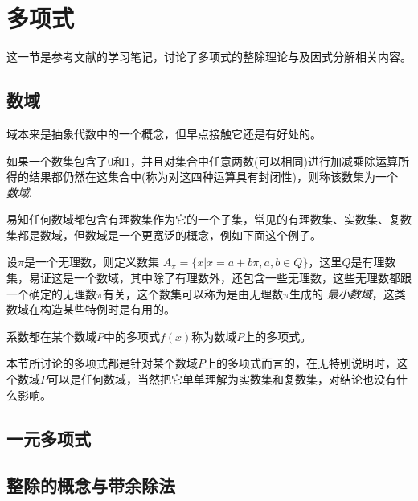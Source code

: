 
\section{多项式}
\label{sec:polynome}

这一节是参考文献\cite{advanced-algebra}的学习笔记，讨论了多项式的整除理论与及因式分解相关内容。

\subsection{数域}
\label{sec:number-field}

域本来是抽象代数中的一个概念，但早点接触它还是有好处的。

\begin{definition}
  如果一个数集包含了0和1，并且对集合中任意两数(可以相同)进行加减乘除运算所得的结果都仍然在这集合中(称为对这四种运算具有封闭性)，则称该数集为一个 \emph{数域}.
\end{definition}

易知任何数域都包含有理数集作为它的一个子集，常见的有理数集、实数集、复数集都是数域，但数域是一个更宽泛的概念，例如下面这个例子。

\begin{example}
  设$\pi$是一个无理数，则定义数集 $A_{\pi} = \{x|x=a+b\pi,a,b\in Q\}$，这里$Q$是有理数集，易证这是一个数域，其中除了有理数外，还包含一些无理数，这些无理数都跟一个确定的无理数$\pi$有关，这个数集可以称为是由无理数$\pi$生成的 \emph{最小数域}，这类数域在构造某些特例时是有用的。
\end{example}

\begin{definition}
  系数都在某个数域$P$中的多项式$f(x)$称为数域$P$上的多项式。
\end{definition}

本节所讨论的多项式都是针对某个数域$P$上的多项式而言的，在无特别说明时，这个数域$P$可以是任何数域，当然把它单单理解为实数集和复数集，对结论也没有什么影响。

\subsection{一元多项式}
\label{sec:polynome-with-one-variable}



\subsection{整除的概念与带余除法}
\label{sec:polynome-integer-division-and-devision-with-remainder}

